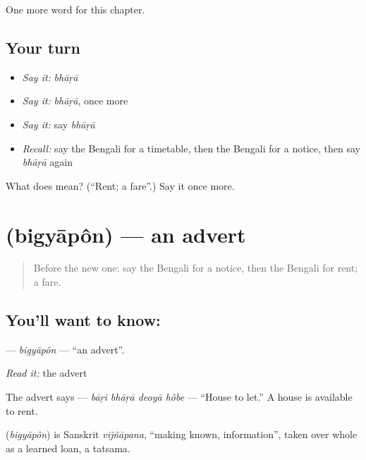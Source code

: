 \begin{grammarlens}[title={What you've built}]
One more word for this chapter.
\end{grammarlens}

\subsection*{Your turn}
\begin{itemize}
\raggedright
  \item \emph{Say it:} \emph{bhāṛā}
  \item \emph{Say it:} \emph{bhāṛā}, once more
  \item \emph{Say it:} say \emph{bhāṛā}
  \item \emph{Recall:} say the Bengali for a timetable, then the Bengali for a notice, then say \emph{bhāṛā} again
\end{itemize}

\begin{tcolorbox}[breakable,colback=teal!4,colframe=teal!35!black,title={Before you move on}]
What does  mean? (\textquotedblleft{}Rent; a fare\textquotedblright{}.) Say it once more.
\end{tcolorbox}
\section[\texorpdfstring{\bn{বিজ্ঞাপন} (bigyāpôn)}{বিজ্ঞাপন (bigyāpôn)}]{ (bigyāpôn) — an advert}

\label{lesson:BN-C147-bigyapon}



\begin{quote}
Before the new one: say the Bengali for a notice, then the Bengali for rent; a fare.
\end{quote}

\subsection*{You'll want to know: }
\textbf{} — \emph{bigyāpôn} — \textquotedblleft{}an advert\textquotedblright{}.

\emph{Read it:} the advert

The advert says \textbf{   } — \emph{bāṛi bhāṛā deoyā hôbe} — \textquotedblleft{}House to let.\textquotedblright{} A house is available to rent.

\begin{cousinweb}
\textbf{} (\emph{bigyāpôn}) is Sanskrit \emph{vijñāpana}, \textquotedblleft{}making known, information\textquotedblright{}, taken over whole as a learned loan, a tatsama.
\end{cousinweb}

